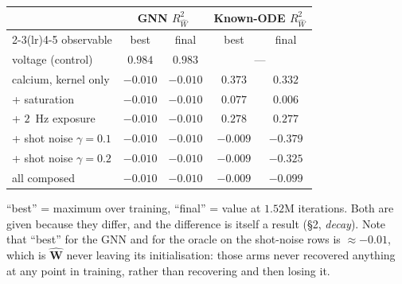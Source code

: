 \documentclass[10pt]{article}
\newcommand{\Rw}{R^2_{\widehat W}}
\newcommand{\Mat}[1]{\mathbf{#1}}
\begin{document}
\begin{center}
{\footnotesize
\begin{tabular}{lcccc}
\toprule
& \multicolumn{2}{c}{GNN $\Rw$} & \multicolumn{2}{c}{Known-ODE $\Rw$} \\
\cmidrule(lr){2-3}\cmidrule(lr){4-5}
observable & best & final & best & final \\
\midrule
voltage (control)                 & $0.984$ & $0.983$ & \multicolumn{2}{c}{---} \\
calcium, kernel only              & $-0.010$ & $-0.010$ & $0.373$ & $0.332$ \\
\quad + saturation                & $-0.010$ & $-0.010$ & $0.077$ & $0.006$ \\
\quad + $2$~Hz exposure           & $-0.010$ & $-0.010$ & $0.278$ & $0.277$ \\
\quad + shot noise $\gamma = 0.1$ & $-0.010$ & $-0.010$ & $-0.009$ & $-0.379$ \\
\quad + shot noise $\gamma = 0.2$ & $-0.010$ & $-0.010$ & $-0.009$ & $-0.325$ \\
\quad all composed                & $-0.010$ & $-0.010$ & $-0.009$ & $-0.099$ \\
\bottomrule
\end{tabular}}

{\footnotesize ``best'' = maximum over training, ``final'' = value at $1.52$M
iterations. Both are given because they differ, and the difference is itself a
result (\S2, \emph{decay}). Note that ``best'' for the GNN and for the oracle on
the shot-noise rows is $\approx -0.01$, which is $\widehat{\Mat{W}}$ never leaving
its initialisation: those arms never recovered anything at any point in training,
rather than recovering and then losing it.}
\end{center}
\end{document}
